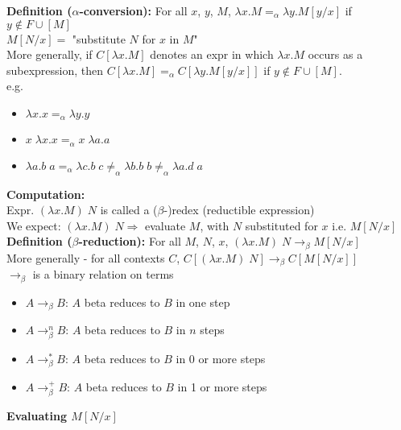 \documentclass[11pt]{article}
\begin{document}
\textbf{Definition ($\alpha$-conversion):} For all $x$, $y$, $M$, $\lambda x.M =_\alpha \lambda y.M[y/x]$ if $y \notin F \cup [M]$ \\

$M[N/x] =$ "substitute $N$ for $x$ in $M$" \\

More generally, if $C[\lambda x.M]$ denotes an expr in which $\lambda x.M$ occurs as a subexpression, then $C[\lambda x.M] =_\alpha C[\lambda y.M[y/x]]$ if $y \notin F \cup [M]$. \\

e.g. 
\begin{itemize}
	\item[] $\lambda x.x =_\alpha \lambda y.y$
	\item[] $x\;\lambda x.x =_\alpha x\;\lambda a.a$
	\item[] $\lambda a.b\;a =_\alpha \lambda c.b\;c \neq_\alpha \lambda b.b\;b \neq_\alpha \lambda a.d\;a$
\end{itemize}

\textbf{Computation:} \\

Expr. $(\lambda x.M)\;N$ is called a ($\beta$-)redex (reductible expression) \\

We expect: $(\lambda x.M)\;N \Rightarrow$ evaluate $M$, with $N$ substituted for $x$ i.e. $M[N/x]$ \\

\textbf{Definition ($\beta$-reduction):} For all $M$, $N$, $x$, $(\lambda x.M)\;N \rightarrow_\beta M[N/x]$ \\

More generally - for all contexts $C$, $C[(\lambda x.M)\;N] \rightarrow_\beta C[M[N/x]]$ \\

$\rightarrow_\beta$ is a binary relation on terms

\begin{itemize}
	\item[] $A \rightarrow_\beta B$: $A$ beta reduces to $B$ in one step
	\item[] $A \rightarrow_\beta^n B$: $A$ beta reduces to $B$ in $n$ steps
	\item[] $A \rightarrow_\beta^* B$: $A$ beta reduces to $B$ in 0 or more steps
	\item[] $A \rightarrow_\beta^+ B$: $A$ beta reduces to $B$ in 1 or more steps
\end{itemize}

\textbf{Evaluating $M[N/x]$} \\
\end{document}
